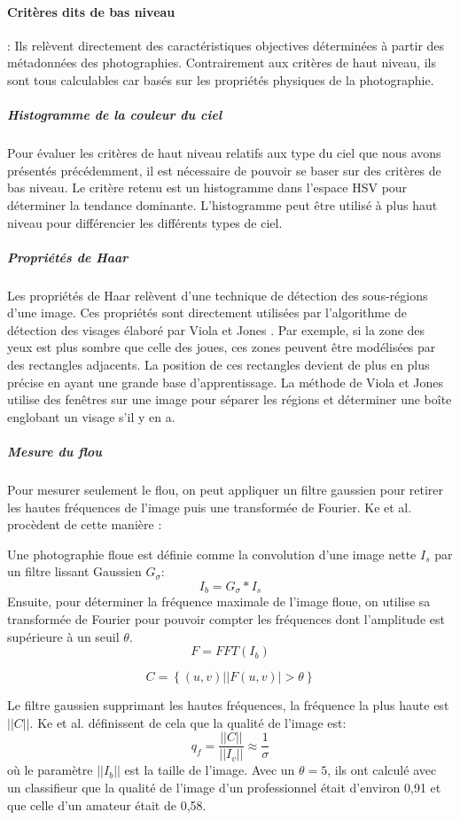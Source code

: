 \documentclass[11pt, french,screen]{report-rd-info}
\begin{document}
\paragraph{Critères dits de bas niveau} : Ils relèvent directement des caractéristiques objectives déterminées à partir des métadonnées des photographies. Contrairement aux critères de haut niveau, ils sont tous calculables car basés sur les propriétés physiques de la photographie.
\subparagraph{Histogramme de la couleur du ciel}
Pour évaluer les critères de haut niveau relatifs aux type du ciel que nous avons présentés précédemment, il est nécessaire de pouvoir se baser sur des critères de bas niveau. Le critère retenu est un histogramme dans l’espace HSV pour déterminer la tendance dominante. L’histogramme peut être utilisé à plus haut niveau pour différencier les différents types de ciel.
\subparagraph{Propriétés de Haar}
Les propriétés de Haar relèvent d’une technique de détection des sous-régions d’une image. Ces propriétés sont directement utilisées par l’algorithme de détection des visages élaboré par Viola et Jones \cite{Viola2004}. Par exemple, si la zone des yeux est plus sombre que celle des joues, ces zones peuvent être modélisées par des rectangles adjacents. La position de ces rectangles devient de plus en plus précise en ayant une grande base d’apprentissage. La méthode de Viola et Jones utilise des fenêtres sur une image pour séparer les régions et déterminer une boîte englobant un visage s’il y en a.
\subparagraph{Mesure du flou}
Pour mesurer seulement le flou, on peut appliquer un filtre gaussien pour retirer les hautes fréquences de l’image puis une transformée de Fourier. Ke et al. \cite{Ke} procèdent de cette manière : 

Une photographie floue est définie comme la convolution d'une image nette $I_s$ par un filtre lissant Gaussien $G_\sigma$:
\begin{equation}
I_b = G_\sigma * I_s 
\end{equation}
Ensuite, pour déterminer la fréquence maximale de l'image floue, on utilise sa transformée de Fourier pour pouvoir compter les fréquences dont l'amplitude est supérieure à un seuil $\theta$.
\begin{equation}
F = FFT(I_b)
\end{equation}

\begin{equation}
C = \left\{(u,v) | |F(u,v)| > \theta\right\}
\end{equation}
 
Le filtre gaussien supprimant les hautes fréquences, la fréquence la plus haute est $||C||$. Ke et al. \cite{Ke} définissent de cela que la qualité de l'image est: 
\begin{equation}
q_f = \frac{||C||}{||I_v||} \approx \frac{1}{\sigma}
\end{equation}
où le paramètre $||I_b||$ est la taille de l'image. Avec un $\theta = 5$, ils ont calculé avec un classifieur que la qualité de l'image d'un professionnel était d'environ 0,91 et que celle d'un amateur était de 0,58.
\end{document}
